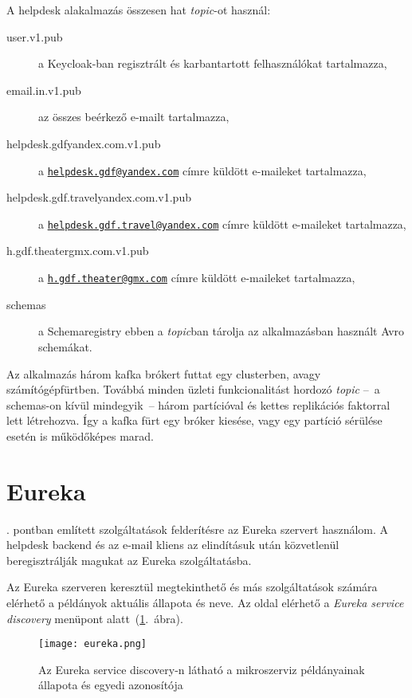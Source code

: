 A helpdesk alakalmazás összesen hat \emph{topic}-ot használ:
\begin{description}
	\item[user.v1.pub] a Keycloak-ban regisztrált és karbantartott felhasználókat tartalmazza,
	
	\item[email.in.v1.pub] az összes beérkező  e-mailt tartalmazza,
	
	\item[helpdesk.gdf\textunderscore yandex.com.v1.pub] a  \href{mailto:helpdesk.gdf@yandex.com}{\nolinkurl{helpdesk.gdf@yandex.com}} címre küldött e-maileket tartalmazza,
	
	\item[helpdesk.gdf.travel\textunderscore yandex.com.v1.pub] a \href{mailto:helpdesk.gdf.travel@yandex.com}{\nolinkurl{helpdesk.gdf.travel@yandex.com}} címre küldött e-maileket tartalmazza,
	
	
	\item[h.gdf.theater\textunderscore gmx.com.v1.pub] a \href{mailto:h.gdf.theater@gmx.com}{\nolinkurl{h.gdf.theater@gmx.com}} címre küldött e-maileket tartalmazza,
	
	\item[\textunderscore schemas] a Schemaregistry ebben a \emph{topic}ban tárolja az alkalmazásban használt Avro schemákat.
\end{description}


Az alkalmazás három kafka brókert futtat egy clusterben, avagy számítógépfürtben. Továbbá minden üzleti funkcionalitást hordozó \emph{topic} --~a \textunderscore schemas-on kívül mindegyik~-- három partícióval és kettes replikációs faktorral lett létrehozva.
Így a kafka fürt egy bróker kiesése, vagy egy partíció sérülése esetén is működőképes marad.


\section{Eureka}
. pontban említett szolgáltatások felderítésre az Eureka szervert használom. A helpdesk backend és az e-mail kliens az elindításuk után közvetlenül beregisztrálják magukat az Eureka szolgáltatásba.

Az Eureka szerveren keresztül megtekinthető és más szolgáltatások számára elérhető a példányok aktuális állapota és neve. Az oldal elérhető a \emph{Eureka service discovery} menüpont alatt~(\ref{fig:eureka}.~ábra).


\begin{figure}[hbt] 
	\centering
	\texttt{[image: eureka.png]}
	\caption[Az Eureka service discovery felülete]{Az Eureka service discovery-n látható a mikroszerviz példányainak állapota és egyedi azonosítója}
	\label{fig:eureka}
\end{figure}

